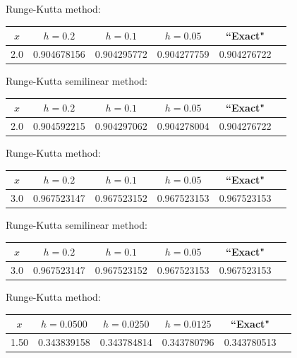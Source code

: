 {\small Runge-Kutta method:
\begin{tabular}{|c|r|r|r|r|r|}
\hline
\multicolumn{1}{|c|}{$x$}&
\multicolumn{1}{|c|}{$h=0.2$}&
\multicolumn{1}{|c|}{$h=0.1$}&
\multicolumn{1}{|c|}{$h=0.05$}&
\multicolumn{1}{|c|}{``Exact"}\\ \hline
2.0 & 0.904678156 & 0.904295772 & 0.904277759 & 0.904276722 \\
\hline
\end{tabular}}\bigskip



\hspace{.75in}
{\small Runge-Kutta semilinear method:
\begin{tabular}{|c|r|r|r|r|r|}
\hline
\multicolumn{1}{|c|}{$x$}&
\multicolumn{1}{|c|}{$h=0.2$}&
\multicolumn{1}{|c|}{$h=0.1$}&
\multicolumn{1}{|c|}{$h=0.05$}&
\multicolumn{1}{|c|}{``Exact"}\\ \hline
2.0 &0.904592215  & 0.904297062 & 0.904278004 & 0.904276722 \\
\hline
\end{tabular}}\bigskip

{\small Runge-Kutta method:
\begin{tabular}{|c|r|r|r|r|r|}
\hline
\multicolumn{1}{|c|}{$x$}&
\multicolumn{1}{|c|}{$h=0.2$}&
\multicolumn{1}{|c|}{$h=0.1$}&
\multicolumn{1}{|c|}{$h=0.05$}&
\multicolumn{1}{|c|}{``Exact"}\\ \hline
3.0 & 0.967523147 & 0.967523152 & 0.967523153 & 0.967523153 \\
\hline
\end{tabular}}\bigskip


\hspace{.75in}
{\small Runge-Kutta semilinear method:
\begin{tabular}{|c|r|r|r|r|r|}
\hline
\multicolumn{1}{|c|}{$x$}&
\multicolumn{1}{|c|}{$h=0.2$}&
\multicolumn{1}{|c|}{$h=0.1$}&
\multicolumn{1}{|c|}{$h=0.05$}&
\multicolumn{1}{|c|}{``Exact"}\\ \hline
3.0 & 0.967523147 & 0.967523152 & 0.967523153 & 0.967523153 \\
\hline
\end{tabular}}\bigskip

{\small Runge-Kutta method:
\begin{tabular}{|c|r|r|r|r|r|}
\hline
\multicolumn{1}{|c|}{$x$}&
\multicolumn{1}{|c|}{$h=0.0500$}&
\multicolumn{1}{|c|}{$h=0.0250$}&
\multicolumn{1}{|c|}{$h=0.0125$}&
\multicolumn{1}{|c|}{``Exact"}\\ \hline
1.50 &0.343839158  & 0.343784814 & 0.343780796 & 0.343780513 \\
\hline
\end{tabular}}\bigskip

